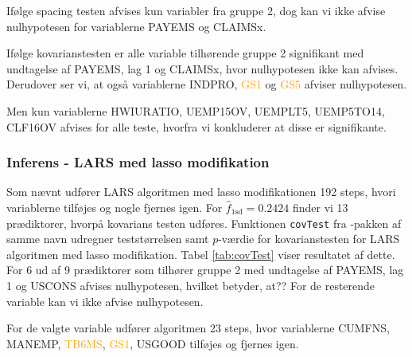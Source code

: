 Ifølge spacing testen afvises kun variabler fra gruppe 2, dog kan vi ikke afvise nulhypotesen for variablerne \textcolor{blue3}{PAYEMS} og \textcolor{blue3}{CLAIMSx}.

Ifølge kovarianstesten er alle variable tilhørende gruppe 2 signifikant med undtagelse af \textcolor{blue3}{PAYEMS}, \textcolor{blue3}{lag 1} og \textcolor{blue3}{CLAIMSx}, hvor nulhypotesen ikke kan afvises. 
Derudover ser vi, at også variablerne \textcolor{chartreuse4}{INDPRO}, \textcolor{orange}{GS1} og \textcolor{orange}{GS5} afviser nulhypotesen.

Men kun variablerne \textcolor{blue3}{HWIURATIO}, \textcolor{blue3}{UEMP15OV}, \textcolor{blue3}{UEMPLT5}, \textcolor{blue3}{UEMP5TO14}, \textcolor{blue3}{CLF16OV} afvises for alle teste, hvorfra vi konkluderer at disse er signifikante.
\newpage
\subsubsection{Inferens - LARS med lasso modifikation}
Som nævnt udfører LARS algoritmen med lasso modifikationen 192 steps, hvori variablerne tilføjes og nogle fjernes igen.
For \(\widehat{f}_{1\text{sd}}=0.2424\) finder vi 13 prædiktorer, hvorpå kovarians testen udføres.
Funktionen \texttt{covTest} fra \Rlang-pakken af samme navn udregner teststørrelsen samt \(p\)-værdie for kovarianstesten for LARS algoritmen med lasso modifikation.
Tabel \ref{tab:covTest} viser resultatet af dette.
For 6 ud af 9 prædiktorer som tilhører gruppe 2 med undtagelse af \textcolor{blue3}{PAYEMS}, \textcolor{blue3}{lag 1} og \textcolor{blue3}{USCONS} afvises nulhypotesen, hvilket betyder, at??
For de resterende variable kan vi ikke afvise nulhypotesen.
%

%
For de valgte variable udfører algoritmen 23 steps, hvor variablerne  \textcolor{chartreuse4}{CUMFNS}, \textcolor{blue3}{MANEMP}, \textcolor{orange}{TB6MS}, \textcolor{orange}{GS1}, \textcolor{blue3}{USGOOD} tilføjes og fjernes igen.

\newpage


%
